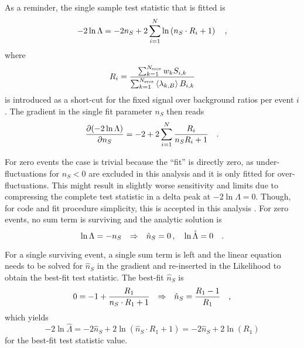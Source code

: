 As a reminder, the single sample test statistic that is fitted is
\begin{equation}
  -2\ln\Lambda
  = -2n_S + 2\sum_{i=1}^N \ln\left(n_S \cdot R_i + 1\right)
  \quad\text{,}
\end{equation}
where
\begin{equation}
  R_i = \frac{\sum_{k=1}^{N_\text{srcs}} w_k S_{i,k}}
             {\sum_{k=1}^{N_\text{srcs}}\Braket{\lambda_{k,B}} B_{i,k}}
\end{equation}
is introduced as a short-cut for the fixed signal over background ratios per event $i$.
The gradient in the single fit parameter $n_S$ then reads
\begin{equation}
  \frac{\partial (-2\ln\Lambda)}{\partial n_S}
  = -2 + 2\sum_{i=1}^N \frac{R_i}{n_S R_i + 1}
  \quad\text{.}
\end{equation}

For zero events the case is trivial because the \enquote{fit} is directly zero, as under-fluctuations for $n_S < 0$ are excluded in this analysis and it is only fitted for over-fluctuations.
This might result in slightly worse sensitivity and limits due to compressing the complete test statistic in a delta peak at $-2\ln\Lambda=0$.
Though, for code and fit procedure simplicity, this is accepted in this analysis \cite{Aartsen:2016lir}.
For zero events, no sum term is surviving and the analytic solution is
\begin{equation}
  \ln\Lambda = -n_S
  \quad\text{$\Rightarrow$}\quad
  \hat{n}_S = 0 \, ,\quad \ln\hat{\Lambda} = 0
  \quad\text{.}
\end{equation}

For a single surviving event, a single sum term is left and the linear equation needs to be solved for $\hat{n}_S$ in the gradient and re-inserted in the Likelihood to obtain the best-fit test statistic.
The best-fit $\hat{n}_S$ is
\begin{equation}
  0 = -1 + \frac{R_1}{n_S\cdot R_1 + 1}
  \quad\text{$\Rightarrow$}\quad
  \hat{n}_S = \frac{R_1 - 1}{R_1}
  \quad\text{,}
\end{equation}
which yields
\begin{equation}
  -2\ln\hat{\Lambda}
    = -2\hat{n}_S + 2\ln\left( \hat{n}_S \cdot R_1 + 1 \right)
    = -2\hat{n}_S + 2\ln(R_1)
\end{equation}
for the best-fit test statistic value.

